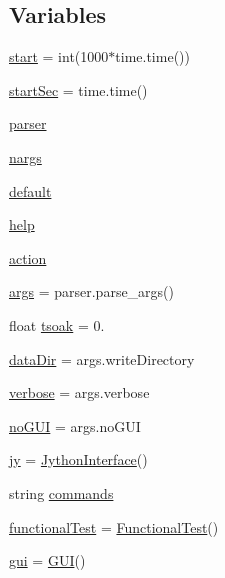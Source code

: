\subsection*{Variables}
\begin{DoxyCompactItemize}
\item 
\hyperlink{namespace_w_r_e_b_test_a10204c9815e05b0ec10333b96a9f23b1}{start} = int(1000$\ast$time.\+time())
\item 
\hyperlink{namespace_w_r_e_b_test_a82e575e7fa540ddb3d203d251cf9dd49}{start\+Sec} = time.\+time()
\item 
\hyperlink{namespace_w_r_e_b_test_af72adb2f5e4faf500bb36f461f008af6}{parser}
\item 
\hyperlink{namespace_w_r_e_b_test_a49236807c2137fa4461bb379abfd33fc}{nargs}
\item 
\hyperlink{namespace_w_r_e_b_test_aaea9bb9d2571f00dcf628f0e3e4838d0}{default}
\item 
\hyperlink{namespace_w_r_e_b_test_adfd76e5c2885c24fa27e9fcec701bba2}{help}
\item 
\hyperlink{namespace_w_r_e_b_test_a8e8a51e687e5a39d05cf45ce0f67ffd1}{action}
\item 
\hyperlink{namespace_w_r_e_b_test_af981cfe9d4ac11e754292636a5f06bdc}{args} = parser.\+parse\+\_\+args()
\item 
float \hyperlink{namespace_w_r_e_b_test_acaeadc24f2eeacc666c9a23b4867302f}{tsoak} = 0.
\item 
\hyperlink{namespace_w_r_e_b_test_a1f2debd7e26cbbabbe9d62214581cfe3}{data\+Dir} = args.\+write\+Directory
\item 
\hyperlink{namespace_w_r_e_b_test_a2c7e905f2a556f0b4afa2261b75a8d58}{verbose} = args.\+verbose
\item 
\hyperlink{namespace_w_r_e_b_test_aed7bb7d828042f54ec6693855fd900ee}{no\+G\+UI} = args.\+no\+G\+UI
\item 
\hyperlink{namespace_w_r_e_b_test_addc827d4eb188c8ba6f94df2c7b6b8fa}{jy} = \hyperlink{class_w_r_e_b_test_1_1_jython_interface}{Jython\+Interface}()
\item 
string \hyperlink{namespace_w_r_e_b_test_af903ad904d8e85aaf3f2df67c479867f}{commands}
\item 
\hyperlink{namespace_w_r_e_b_test_a6b29a5575cde4179f69fd406d86e7376}{functional\+Test} = \hyperlink{class_w_r_e_b_test_1_1_functional_test}{Functional\+Test}()
\item 
\hyperlink{namespace_w_r_e_b_test_aa381e7d29068259ccd5af4c247ed6ef4}{gui} = \hyperlink{class_w_r_e_b_test_1_1_g_u_i}{G\+UI}()
\end{DoxyCompactItemize}


